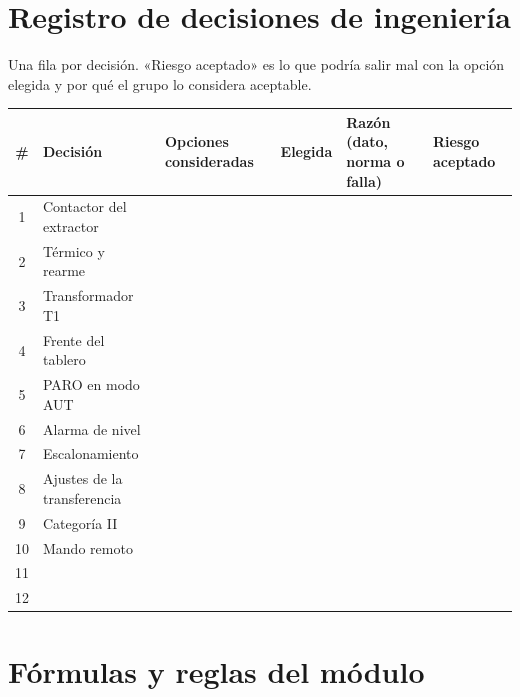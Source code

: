 \documentclass[11pt,a4paper]{article}
\begin{document}
\newpage
\appendix
\renewcommand{\thesection}{\Alph{section}}
\section{Registro de decisiones de ingeniería}

Una fila por decisión. «Riesgo aceptado» es lo que podría salir mal con la opción elegida y por qué el grupo lo considera aceptable.

\begin{center}\small\renewcommand{\arraystretch}{1.15}
\begin{tabularx}{\linewidth}{@{}c p{2.6cm} L L L L@{}}
\toprule
\textbf{\#} & \textbf{Decisión} & \textbf{Opciones consideradas} & \textbf{Elegida} & \textbf{Razón (dato, norma o falla)} & \textbf{Riesgo aceptado}\\
 & Contactor del extractor & & & & \\[1.3cm]
2 & Térmico y rearme & & & & \\[1.3cm]
3 & Transformador T1 & & & & \\[1.3cm]
4 & Frente del tablero & & & & \\[1.3cm]
5 & PARO en modo AUT & & & & \\[1.3cm]
6 & Alarma de nivel & & & & \\[1.3cm]
7 & Escalonamiento & & & & \\[1.3cm]
8 & Ajustes de la transferencia & & & & \\[1.3cm]
9 & Categoría II & & & & \\[1.3cm]
10 & Mando remoto & & & & \\[1.3cm]
11 & & & & & \\[1.3cm]
12 & & & & & \\[1.3cm]
\bottomrule
\end{tabularx}
\end{center}

\section{Fórmulas y reglas del módulo}
\end{document}
